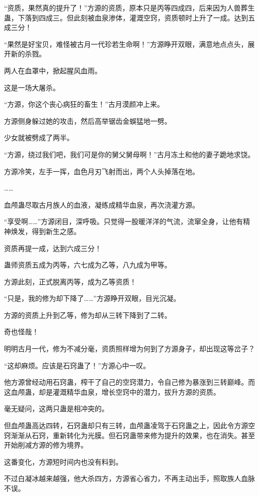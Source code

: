 \begin{this_body}
“资质，果然真的提升了！”方源的资质，原本只是丙等四成四，后来因为人兽葬生蛊，下落到四成三。但此刻被血泉渗体，灌溉空窍，资质顿时上升了一成。达到五成三分！

“果然是好宝贝，难怪被古月一代珍若生命啊！”方源睁开双眼，满意地点点头，展开新的杀戮。

两人在血罩中，掀起腥风血雨。

这是一场大屠杀。

“方源，你这个丧心病狂的畜生！”古月漠颜冲上来。

方源侧身躲过她的攻击，然后高举锯齿金蜈猛地一劈。

少女就被劈成了两半。

“方源，绕过我们吧，我们可是你的舅父舅母啊！”古月冻土和他的妻子跪地求饶。

方源冷笑，左手一挥，血色月刃飞射而出，两个人头掉落在地。

……

血颅蛊尽取古月族人的血液，凝练成精华血泉，再次浇灌方源。

“享受啊……”方源闭目，深呼吸。只觉得一股暖洋洋的气流，流窜全身，让他有精神焕发，得到新生之感。

资质再提一成，达到六成三分！

蛊师资质五成为丙等，六七成为乙等，八九成为甲等。

方源此刻，正式脱离丙等，成为乙等资质！

“只是，我的修为却下降了……”方源睁开双眼，目光沉凝。

方源的资质上升到乙等，修为却从三转下降到了二转。

奇也怪哉！

明明古月一代，修为不减分毫，资质照样增为何到了方源身子，却出现这等岔子？

“这却麻烦。应该是石窍蛊了！”方源心中一叹。

他方源曾经动用石窍蛊，榨干了自己的空窍潜力，令自己修为暴涨到三转巅峰。而这血颅蛊，却是灌溉精华血泉，增长空窍中的潜力，拔升方源的资质。

毫无疑问，这两只蛊是相冲突的。

但血颅蛊高达四转，石窍蛊却只有三转，血颅蛊凌驾于石窍蛊之上，因此令方源空窍渐渐从石窍，重新转化为光膜。但石窍蛊带来修为提升的效果，也在消失。甚至开始削减方源的修为境界。

这番变化，方源短时间内也没有料到。

不过白凝冰越来越强，他大杀四方，方源省心省力，不再主动出手，照取族人血脉不误。


\end{this_body}
